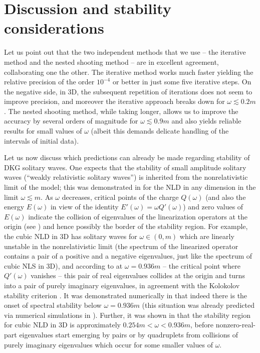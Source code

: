 \documentclass[12pt]{extarticle}
\theoremstyle{plain}
\theoremstyle{remark}
\begin{document}
\section{Discussion and
stability considerations}
\label{sect-stability}

Let us point out that
the two independent methods that we use -- the iterative method and the nested shooting method -- are in excellent agreement, collaborating one the other.
The iterative method works much faster
yielding the relative precision of
the order $10^{-4}$ or better
in just some five iterative steps.
On the negative side,
in 3D,
the subsequent repetition of iterations
does not seem to improve precision,
and moreover the iterative approach
breaks down for $\omega\lesssim 0.2m$.
The nested shooting method, while
taking longer,
allows us to improve the accuracy by
several orders of magnitude
for $\omega\lesssim 0.9m$
and also yields reliable
results for
small values of $\omega$
(albeit this demands delicate handling of
the intervals of initial data).


Let us now discuss which predictions
can already be made regarding stability
of DKG solitary waves.
One expects that
the stability of small amplitude solitary waves
(``weakly relativistic solitary waves'')
is inherited from the nonrelativistic limit of the model;
this was demonstrated in
\cite{comech2014linear,boussaid2019spectral}
for the NLD in any dimension
in the limit $\omega\lesssim m$.
As $\omega$ decreases,
critical points of
the charge $Q(\omega)$
(and also the energy $E(\omega)$
in view of the identity $E'(\omega)=\omega Q'(\omega)$)
and zero values of $E(\omega)$
indicate the collision of eigenvalues of the
linearization operators at the origin
(see \cite{berkolaiko2015vakhitov})
and hence
possibly the border of the stability region.
For example, the cubic NLD in 3D
has solitary waves
for $\omega\in(0,m)$
which are
linearly unstable in the
nonrelativistic limit
(the spectrum of the linearized operator
contains a pair of a positive and a negative
eigenvalues, just like the spectrum of 
cubic NLS in 3D),
and
according to \cite{PhysRevLett.116.214101}
at $\omega=0.936m$
-- the critical point where $Q'(\omega)$ vanishes -- 
this pair of real eigenvalues collides
at the origin and turns into a pair of
purely imaginary eigenvalues,
in agreement with
the Kolokolov stability criterion
\cite{kolokolov-1973}.
It was demonstrated numerically in
\cite{comech2025stable}
that indeed there is the onset
of spectral stability
below $\omega=0.936m$
(this situation was already predicted
via numerical simulations in
\cite{PhysRevLett.50.1230}).
Further, it was shown
in \cite{comech2025stable}
that the stability region
for cubic NLD in 3D
is
approximately
$0.254 m<\omega<0.936 m$,
before nonzero-real-part eigenvalues
start emerging by pairs or by quadruplets
from collisions of purely imaginary eigenvalues
which occur for some smaller values of $\omega$.
\end{document}

